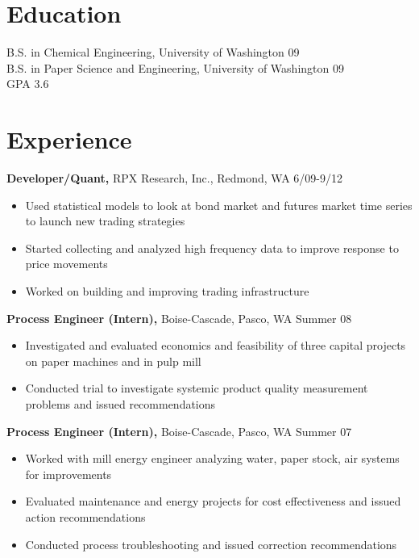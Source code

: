 \documentclass[margin]{res}
\begin{document}
 
 
 
\begin{resume} 
 
\section{Education} 
B.S. in Chemical Engineering, University of Washington 09 \\
B.S. in Paper Science and Engineering, University of Washington 09\\
GPA 3.6 
 
\section{Experience}
  {\bf Developer/Quant,} RPX Research, Inc., Redmond, WA \hfill 6/09-9/12
   \begin{itemize} \itemsep -2pt  %
     \item Used statistical models to look at bond market and futures market time series to launch new trading strategies 
     \item Started collecting and analyzed high frequency data to improve response to price movements
     \item Worked on building and improving trading infrastructure
   \end{itemize}



  {\bf Process Engineer (Intern),} Boise-Cascade, Pasco, WA \hfill  Summer 08
  \begin{itemize} \itemsep -2pt %
    \item Investigated and evaluated economics and feasibility of three capital projects on paper machines and in pulp mill 
    \item Conducted trial to investigate systemic product quality measurement problems and issued recommendations 
  \end{itemize}

  {\bf Process Engineer (Intern),} Boise-Cascade, Pasco, WA \hfill  Summer 07
  \begin{itemize} \itemsep -2pt
    \item Worked with mill energy engineer analyzing water, paper stock, air systems for improvements 
    \item Evaluated maintenance and energy projects for cost effectiveness and issued action recommendations 
    \item Conducted process troubleshooting and issued correction recommendations
   \end{itemize}


\end{resume}
\end{document}

